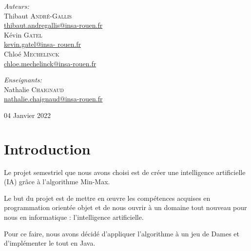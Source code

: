 \documentclass[12,french]{report}
\begin{document}
\begin{titlepage}
\begin{center}
	\begin{minipage}{0.4\textwidth}
		\begin{flushleft} \large
			\emph{Auteurs:}\\
			Thibaut \textsc{André-Gallis} \\
			{\small\href{mailto:thibaut.andregallis@insa-rouen.fr}{thibaut.andregallis@insa-rouen.fr}} \\
			Kévin \textsc{Gatel} \\
			{\small\href{mailto:kevin.gatel@insa-rouen.fr}{kevin.gatel@insa-				rouen.fr}}\\
			Chloé \textsc{Mechelinck} \\
			{\small\href{mailto:chloe.mechelinck@insa-rouen.fr}{chloe.mechelinck@insa-rouen.fr}}
		\end{flushleft}
	\end{minipage}
	\begin{minipage}{0.4\textwidth}
		\begin{flushright} \large
			\emph{Enseignants:} \\
			Nathalie \textsc{Chaignaud} \\
			{\small\href{mailto:nathalie.chaignaud@insa-rouen.fr}								{nathalie.chaignaud@insa-rouen.fr}}\\
		\end{flushright}
	\end{minipage}

	\vfill
	{\large 04 Janvier 2022}
\end{center}
\end{titlepage}

\tableofcontents

\renewcommand{\chaptername}{}

\chapter*{Introduction}

Le projet semestriel que nous avons choisi est de créer une intelligence artificielle (IA) grâce à l'algorithme Min-Max. 


Le but du projet est de mettre en œuvre les compétences acquises en programmation orientée objet et de nous ouvrir à un domaine tout nouveau pour nous en informatique : l'intelligence artificielle.


Pour ce faire, nous avons décidé d'appliquer l'algorithme à un jeu de Dames et d'implémenter le tout en Java.
\end{document}
